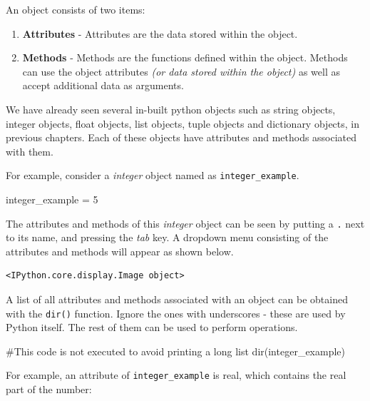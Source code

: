 \documentclass[
  letterpaper,
  DIV=11,
  numbers=noendperiod]{scrreprt}
\newenvironment{Shaded}{\begin{snugshade}}{\end{snugshade}}
\newcommand{\BuiltInTok}[1]{\textcolor[rgb]{0.00,0.23,0.31}{#1}}
\newcommand{\CommentTok}[1]{\textcolor[rgb]{0.37,0.37,0.37}{#1}}
\newcommand{\DecValTok}[1]{\textcolor[rgb]{0.68,0.00,0.00}{#1}}
\newcommand{\NormalTok}[1]{\textcolor[rgb]{0.00,0.23,0.31}{#1}}
\newcommand{\OperatorTok}[1]{\textcolor[rgb]{0.37,0.37,0.37}{#1}}
\begin{document}
An object consists of two items:

\begin{enumerate}
\def\labelenumi{\arabic{enumi}.}
\item
  \textbf{Attributes} - Attributes are the data stored within the
  object.
\item
  \textbf{Methods} - Methods are the functions defined within the
  object. Methods can use the object attributes \emph{(or data stored
  within the object)} as well as accept additional data as arguments.
\end{enumerate}

We have already seen several in-built python objects such as string
objects, integer objects, float objects, list objects, tuple objects and
dictionary objects, in previous chapters. Each of these objects have
attributes and methods associated with them.

For example, consider a \emph{integer} object named as
\texttt{integer\_example}.

\begin{Shaded}
\begin{Highlighting}[]
\NormalTok{integer\_example }\OperatorTok{=} \DecValTok{5}
\end{Highlighting}
\end{Shaded}

The attributes and methods of this \emph{integer} object can be seen by
putting a \texttt{.} next to its name, and pressing the \emph{tab} key.
A dropdown menu consisting of the attributes and methods will appear as
shown below.

\begin{verbatim}
<IPython.core.display.Image object>
\end{verbatim}

A list of all attributes and methods associated with an object can be
obtained with the \texttt{dir()} function. Ignore the ones with
underscores - these are used by Python itself. The rest of them can be
used to perform operations.

\begin{Shaded}
\begin{Highlighting}[]
\CommentTok{\#This code is not executed to avoid printing a long list}
\BuiltInTok{dir}\NormalTok{(integer\_example)}
\end{Highlighting}
\end{Shaded}

For example, an attribute of \texttt{integer\_example} is real, which
contains the real part of the number:
\end{document}
